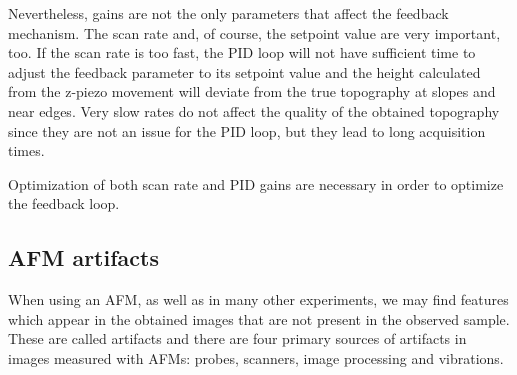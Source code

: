 \documentclass[11pt,a4paper]{article}
\begin{document}
Nevertheless, gains are not the only parameters that affect the feedback mechanism. The scan rate and, of course, the setpoint value are very important, too. If the scan rate is too fast, the PID loop will not have sufficient time to adjust the feedback parameter to its setpoint value and the height calculated from the z-piezo movement will deviate from the true topography at slopes and near edges. Very slow rates do not affect the quality of the obtained topography since they are not an issue for the PID loop, but they lead to long acquisition times.

Optimization of both scan rate and PID gains are necessary in order to optimize the feedback loop.

\subsection{AFM artifacts}
When using an AFM, as well as in many other experiments, we may find features which appear in the obtained images that are not present in the observed sample. These are called artifacts \cite{artifacts} and there are four primary sources of artifacts in images measured with AFMs: probes, scanners, image processing and vibrations.
\end{document}
